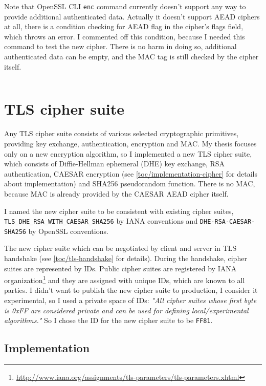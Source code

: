 \inputminted{text}{code/test-enc.sh.out}

Note that OpenSSL CLI \texttt{enc} command currently doesn't support any way to provide additional authenticated data. Actually it doesn't support AEAD ciphers at all, there is a condition checking for AEAD flag in the cipher's flags field, which throws an error. I commented off this condition, because I needed this command to test the new cipher. There is no harm in doing so, additional authenticated data can be empty, and the MAC tag is still checked by the cipher itself.

\inputminted{c}{code/openssl/apps/enc.c}


\section{TLS cipher suite}
\label{toc/implementation-cipher-suite}

Any TLS cipher suite consists of various selected cryptographic primitives, providing key exchange, authentication, encryption and MAC. My thesis focuses only on a new encryption algorithm, so I implemented a new TLS cipher suite, which consists of Diffie-Hellman ephemeral (DHE) key exchange, RSA authentication, CAESAR encryption (see \autoref{toc/implementation-cipher} for details about implementation) and SHA256 pseudorandom function. There is no MAC, because MAC is already provided by the CAESAR AEAD cipher itself.

I named the new cipher suite to be consistent with existing cipher suites, \texttt{TLS\_DHE\_RSA\_WITH\_CAESAR\_SHA256} by IANA conventions and \texttt{DHE-RSA-CAESAR-SHA256} by OpenSSL conventions.

The new cipher suite which can be negotiated by client and server in TLS handshake (see \autoref{toc/tls-handshake} for details). During the handshake, cipher suites are represented by IDs. Public cipher suites are registered by IANA organization\footnote{\url{http://www.iana.org/assignments/tls-parameters/tls-parameters.xhtml}} and they are assigned with unique IDs, which are known to all parties. I didn't want to publish the new cipher suite to production, I consider it experimental, so I used a private space of IDs: \textit{"All cipher suites whose first byte is 0xFF are considered private and can be used for defining local/experimental algorithms."} \cite{rfc2246} So I chose the ID for the new cipher suite to be \texttt{FF81}.

\subsection{Implementation}

